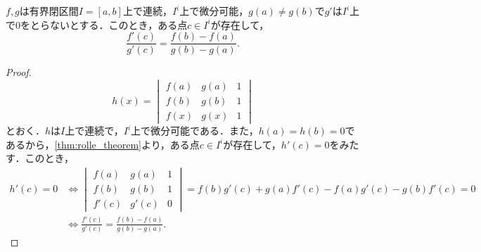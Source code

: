 \documentclass[a4paper,10pt]{ltjsarticle}
\begin{document}
\begin{MyTheorem}
  \(f, g\)は有界閉区間\(I=[a, b]\)上で連続，\(I^i\)上で微分可能，\(g(a) \ne g(b)\)で\(g'\)は\(I^i\)上で\(0\)をとらないとする．このとき，ある点\(c \in I^i\)が存在して，
  \[ \frac{f'(c)}{g'(c)} = \frac{f(b) - f(a)}{g(b) - g(a)}. \]
\end{MyTheorem}
\begin{proof}
  \[ h(x) = \begin{vmatrix}
      f(a) & g(a) & 1 \\
      f(b) & g(b) & 1 \\
      f(x) & g(x) & 1
    \end{vmatrix}
  \]
  とおく．\(h\)は\(I\)上で連続で，\(I^i\)上で微分可能である．また，\(h(a) = h(b) = 0\)であるから，\cref{thm:rolle_theorem}より，ある点\(c \in I^i\)が存在して，\(h'(c) = 0\)をみたす．このとき，
  \begin{align*}
    h'(c) = 0 & \iff \begin{vmatrix}
                       f(a)  & g(a)  & 1 \\
                       f(b)  & g(b)  & 1 \\
                       f'(c) & g'(c) & 0
                     \end{vmatrix} = f(b)g'(c) + g(a)f'(c) - f(a)g'(c) - g(b)f'(c) = 0 \\
              & \iff \frac{f'(c)}{g'(c)} = \frac{f(b) - f(a)}{g(b) - g(a)}.
  \end{align*}
\end{proof}
\end{document}

